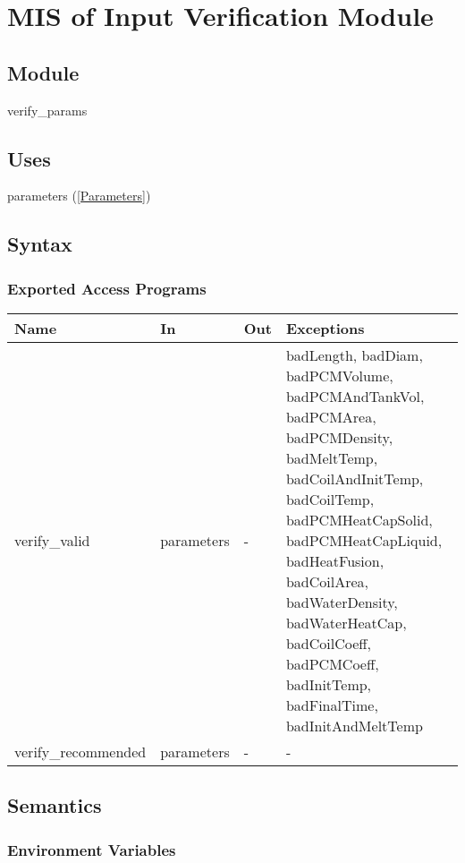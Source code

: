 \documentclass[12pt]{article}
\begin{document}
\section{MIS of Input Verification Module} \label{VerifyInput}

\subsection{Module}

verify\_params

\subsection{Uses}

parameters (\ref{Parameters})

\subsection{Syntax}

\subsubsection{Exported Access Programs}

\begin{center}
\begin{tabular}{p{4cm} p{2cm} p{2cm} p{6cm}}
\hline
\textbf{Name} & \textbf{In} & \textbf{Out} & \textbf{Exceptions} \\
\hline
verify\_valid & parameters & - & badLength, badDiam, badPCMVolume, badPCMAndTankVol, badPCMArea, badPCMDensity, badMeltTemp, badCoilAndInitTemp, badCoilTemp, badPCMHeatCapSolid, badPCMHeatCapLiquid, badHeatFusion, badCoilArea, badWaterDensity, badWaterHeatCap, badCoilCoeff, badPCMCoeff, badInitTemp, badFinalTime, badInitAndMeltTemp \\
\hline
verify\_recommended & parameters & - & - \\
\hline
\end{tabular}
\end{center}

\subsection{Semantics}

\subsubsection{Environment Variables}
\end{document}
